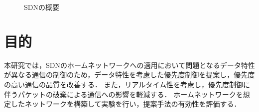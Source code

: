 \documentclass[a4paper,11pt,uplatex]{ujreport}
\begin{document}
  \begin{figure}[!tb]
    \centering
    \caption{SDNの概要}
    \label{fig:sdn}
  \end{figure}

\section{目的}
\label{sec:目的}

    本研究では，SDNのホームネットワークへの適用において問題となるデータ特性が異なる通信の制御のため，データ特性を考慮した優先度制御を提案し，優先度の高い通信の品質を改善する．
    また，リアルタイム性を考慮し，優先度制御に伴うパケットの破棄による通信への影響を軽減する．
    ホームネットワークを想定したネットワークを構築して実験を行い，提案手法の有効性を評価する．




\end{document}
